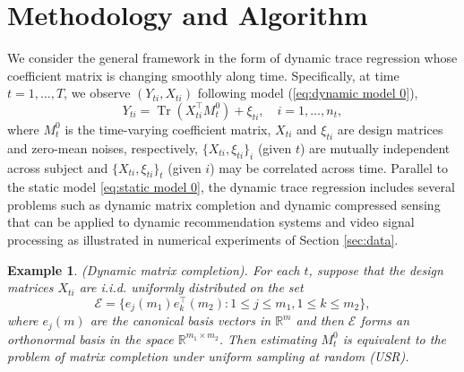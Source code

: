 \documentclass[12pt]{article}
\newtheorem{emp}{Example}
\def\Tr{\operatorname{Tr}}
\begin{document}
\section{Methodology and Algorithm}
\label{method}
We consider the general framework in the form of dynamic trace regression whose coefficient matrix is changing smoothly along time. Specifically, at time $t=1,\ldots,T$, we observe $(Y_{ti},X_{ti})$ following model (\ref{eq:dynamic model 0}), 
  \begin{equation*}
  Y_{t i} = \Tr(X_{t i}^\top M_t^0) +\xi_{t i},\quad i=1,\ldots,n_t,
  \end{equation*}
  where $M_t^0$ is the time-varying coefficient matrix, $X_{ti}$ and $\xi_{ti}$ are design matrices and zero-mean noises, respectively, $\{X_{ti},\xi_{ti}\}_i$ (given $t$) are mutually independent across subject and $\{X_{ti},\xi_{ti}\}_t$ (given $i$) may be correlated across time.
 Parallel to the static model \eqref{eq:static model 0}, the dynamic trace regression includes several problems such as dynamic matrix completion and dynamic compressed sensing that can be applied to dynamic recommendation systems and video signal processing as illustrated in numerical experiments of Section \ref{sec:data}.%
  

  \begin{emp}\label{emp:mc} (Dynamic matrix completion). For each $t$, suppose that the design matrices $X_{ti}$ are i.i.d. uniformly distributed on the set
  \begin{equation} \label{eq:dmc}
  \mathcal{E}=\{e_j(m_1)e_k^\top(m_2):1\le j\le m_1, 1\le k\le m_2\},
  \end{equation}
  where $e_j(m)$ are the canonical basis vectors in $\mathbb{R}^m$ and then $\mathcal{E}$ forms an orthonormal basis in the space $\mathbb{R}^{m_1\times m_2}$. %
  Then estimating $M_t^0$ is equivalent to the problem of matrix completion under uniform sampling at random (USR). 
  \end{emp} 
\end{document}
